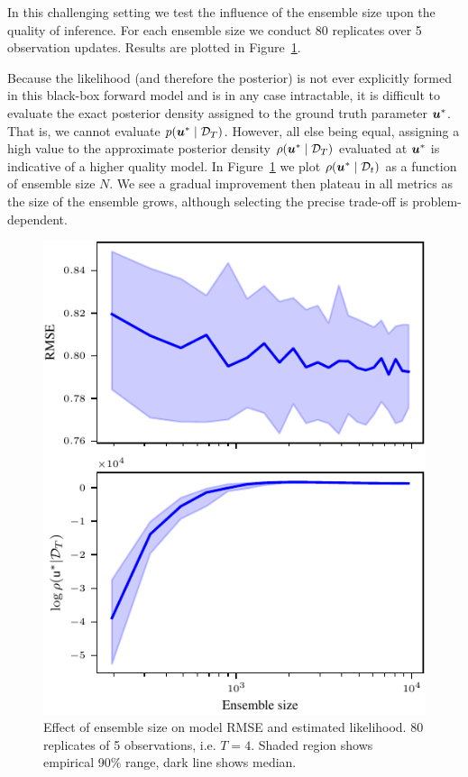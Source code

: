\documentclass{article}
\theoremstyle{plain}
\theoremstyle{definition}
\theoremstyle{remark}
\begin{document}
In this challenging setting we test the influence of the ensemble size upon the quality of \meth{} inference.
For each ensemble size we conduct 80 replicates over 5 observation updates.
Results are plotted in Figure~\ref{fig:n_ens}.

Because the likelihood (and therefore the posterior) is not ever explicitly formed in this black-box forward model and is in any case intractable, it is difficult to evaluate the exact posterior density assigned to the ground truth parameter $\boldsymbol{u}^\ast$.
That is, we cannot evaluate $p(\boldsymbol{u}^\ast \mid \mathcal{D}_T)$.
However, all else being equal, assigning a high value to the approximate posterior density $\rho(\boldsymbol{u}^\ast \mid \mathcal{D}_T)$ evaluated at $\boldsymbol{u}^\ast$ is indicative of a higher quality model.
In Figure~\ref{fig:n_ens} we plot $\rho(\boldsymbol{u}^\ast \mid \mathcal{D}_t)$ as a function of ensemble size $N$.
We see a gradual improvement then plateau in all metrics as the size of the ensemble grows, although selecting the precise trade-off is problem-dependent.


\begin{figure}[h!t]
    \centering
     \includegraphics[scale=1]{meth_ex_ens_5.pdf}
    \centering
    \caption{Effect of ensemble size on model RMSE and estimated likelihood. 80 replicates of 5 observations, i.e. \(T=4\). Shaded region shows empirical 90\% range, dark line shows median.}
    \label{fig:n_ens}
\end{figure}
\end{document}
